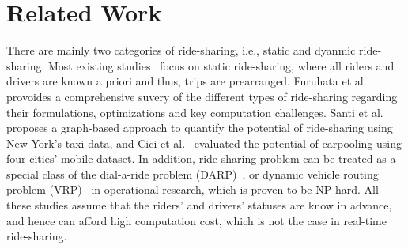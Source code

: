 \vspace{-2mm}
\section{Related Work}
\label{sec:related}

There are mainly two categories of ride-sharing, i.e., static and dyanmic ride-sharing. Most existing studies~\cite{FuruhataTRB13, Santi14, CiciUbicom14} focus on static ride-sharing, where all riders and drivers are known a priori and thus, trips are prearranged. Furuhata et al.~\cite{FuruhataTRB13} provoides a comprehensive suvery of the different types of ride-sharing regarding their formulations, optimizations and key computation challenges. Santi et al.~\cite{Santi14} proposes a graph-based approach to quantify the potential of ride-sharing using New York's taxi data, and Cici et al.~\cite{CiciUbicom14} evaluated the potential of carpooling using four cities' mobile dataset. In addition, ride-sharing problem can be treated as a special class of the dial-a-ride problem (DARP)~\cite{Cordeau07}, or dynamic vehicle routing problem (VRP)~\cite{Dantzig59, LiSstd15} in operational research, which is proven to be NP-hard. All these studies assume that the riders' and drivers' statuses are know in advance, and hence can afford high computation cost, which is not the case in real-time ride-sharing.

